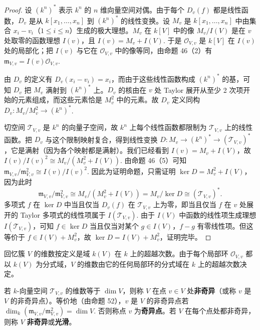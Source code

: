 \begin{proof}
设 \((k^n)^*\) 表示 \(k^n\) 的 \(n\) 维向量空间对偶。由于每个 \(D_v(f)\) 都是线性函数，\(D_v\) 是从 \(k[x_1, \ldots, x_n]\) 到 \((k^n)^*\) 的线性变换。设 \(M_v\) 是 \(k[x_1, \ldots, x_n]\) 中由集合 \(x_i-v_i\)（\(1 \leq i \leq n\)）生成的极大理想。\(M_v\) 在 \(k[V]\) 中的像 \(M_v/I(V)\) 是在 \(v\) 处取零的函数理想 \(I(v)\)，且 \(I(v) = M_v+I(V)\). 于是 \(\mathcal{O}_{V,v}\) 是 \(k[V]\) 在 \(I(v)\) 处的局部化；把 \(I(v)\) 与它在 \(\mathcal{O}_{V,v}\) 中的像等同，由命题 46（2）有 \(\mathfrak{m}_{V,v} = I(v)\mathcal{O}_{V,v}\).

由 \(D_v\) 的定义有 \(D_v(x_i-v_i) = x_i\)，而由于这些线性函数构成 \((k^n)^*\) 的基，可知 \(D_v\) 把 \(M_v\) 满射到 \((k^n)^*\) 上。\(D_v\) 的核由在 \(v\) 处 Taylor 展开从至少 2 次项开始的元素组成，而这些元素恰是 \(M_v^2\) 中的元素。故 \(D_v\) 定义同构 \(D_v : M_v/M_v^2 \to (k^n)^*\).

切空间 \(\mathcal{T}_{V,v}\) 是 \(k^n\) 的向量子空间，故 \(k^n\) 上每个线性函数都限制为 \(\mathcal{T}_{V,v}\) 上的线性函数。把 \(D_v\) 与这个限制映射复合，得到线性变换 \(D : M_v \to (k^n)^* \to (\mathcal{T}_{V,v})^*\)，它是满射（因为各个映射都是满射）。我们已经看到 \(I(v) = M_v+I(V)\)，故 \(I(v)/I(v)^2 \cong M_v/(M_v^2+I(V))\). 由命题 46（5）可知 \(\mathfrak{m}_{V,v}/\mathfrak{m}_{V,v}^2 \cong I(v)/I(v)^2\). 因此为证明命题，只需证明 \(\ker D = M_v^2+I(V)\)，因为此时
\[
\mathfrak{m}_{V,v}/\mathfrak{m}_{V,v}^2 \cong M_v/(M_v^2+I(V)) = M_v/\ker D \cong (\mathcal{T}_{V,v})^*.
\]
多项式 \(f\) 在 \(\ker D\) 中当且仅当 \(D_v(f)\) 在 \(\mathcal{T}_{V,v}\) 上为零，即当且仅当 \(f\) 在 \(v\) 处展开的 Taylor 多项式的线性项属于 \(I(\mathcal{T}_{V,v})\). 由于 \(I(V)\) 中函数的线性项生成理想 \(I(\mathcal{T}_{V,v})\)，可知 \(f \in \ker D\) 当且仅当对某个 \(g \in I(V)\)，\(f-g\) 有零线性项。但这等价于 \(f \in I(V)+M_v^2\)，故 \(\ker D = I(V)+M_v^2\)，证明完毕。
\end{proof}

回忆簇 \(V\) 的维数按定义是域 \(k(V)\) 在 \(k\) 上的超越次数。由于每个局部环 \(\mathcal{O}_{V,v}\) 都以 \(k(V)\) 为分式域，\(V\) 的维数由它的任何局部环的分式域在 \(k\) 上的超越次数决定。

\begin{definition}
若 \(k\)-向量空间 \(\mathcal{T}_{V,v}\) 的维数等于 \(\dim V\)，则称 \(V\) 在点 \(v \in V\) 处\textbf{非奇异}（或称 \(v\) 是 \(V\) 的非奇异点）。等价地（由命题 52），\(v\) 是 \(V\) 的非奇异点若 \(\dim_k(\mathfrak{m}_{V,v}/\mathfrak{m}_{V,v}^2) = \dim V\). 否则称点 \(v\) 为\textbf{奇异点}。若 \(V\) 在每个点处都非奇异，则称 \(V\) \textbf{非奇异}或\textbf{光滑}。
\end{definition}

